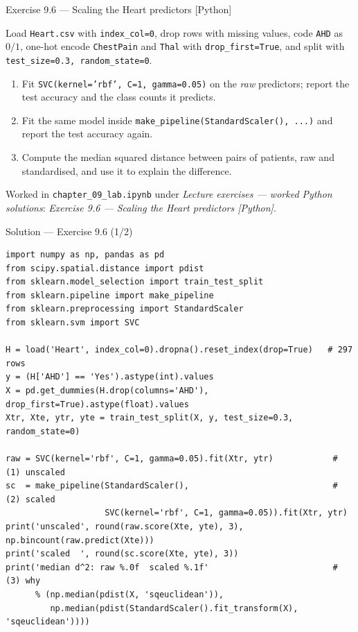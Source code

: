 \documentclass[aspectratio=169,11pt]{beamer}
\begin{document}
\begin{frame}{Exercise 9.6 --- Scaling the Heart predictors [Python]}
\begin{exercise}
  Load \texttt{Heart.csv} with \texttt{index\_col=0}, drop rows with missing
  values, code \texttt{AHD} as $0/1$, one-hot encode \texttt{ChestPain} and
  \texttt{Thal} with \texttt{drop\_first=True}, and split with
  \texttt{test\_size=0.3, random\_state=0}.
  \begin{enumerate}
    \item Fit \texttt{SVC(kernel='rbf', C=1, gamma=0.05)} on the \emph{raw}
          predictors; report the test accuracy and the class counts it predicts.
    \item Fit the same model inside
          \texttt{make\_pipeline(StandardScaler(), ...)} and report the test
          accuracy again.
    \item Compute the median squared distance between pairs of patients, raw
          and standardised, and use it to explain the difference.
  \end{enumerate}
\end{exercise}
\begin{labnote}
  Worked in \texttt{chapter\_09\_lab.ipynb} under \emph{Lecture exercises ---
  worked Python solutions}: \emph{Exercise 9.6 --- Scaling the Heart
  predictors [Python]}.
\end{labnote}
\end{frame}

\begin{frame}[fragile]{Solution --- Exercise 9.6 (1/2)}
\begin{solutionbox}
\begin{lstlisting}[basicstyle=\ttfamily\tiny]
import numpy as np, pandas as pd
from scipy.spatial.distance import pdist
from sklearn.model_selection import train_test_split
from sklearn.pipeline import make_pipeline
from sklearn.preprocessing import StandardScaler
from sklearn.svm import SVC

H = load('Heart', index_col=0).dropna().reset_index(drop=True)   # 297 rows
y = (H['AHD'] == 'Yes').astype(int).values
X = pd.get_dummies(H.drop(columns='AHD'), drop_first=True).astype(float).values
Xtr, Xte, ytr, yte = train_test_split(X, y, test_size=0.3, random_state=0)

raw = SVC(kernel='rbf', C=1, gamma=0.05).fit(Xtr, ytr)            # (1) unscaled
sc  = make_pipeline(StandardScaler(),                             # (2) scaled
                    SVC(kernel='rbf', C=1, gamma=0.05)).fit(Xtr, ytr)
print('unscaled', round(raw.score(Xte, yte), 3), np.bincount(raw.predict(Xte)))
print('scaled  ', round(sc.score(Xte, yte), 3))
print('median d^2: raw %.0f  scaled %.1f'                         # (3) why
      % (np.median(pdist(X, 'sqeuclidean')),
         np.median(pdist(StandardScaler().fit_transform(X), 'sqeuclidean'))))
\end{lstlisting}
\end{solutionbox}
\end{frame}
\end{document}
